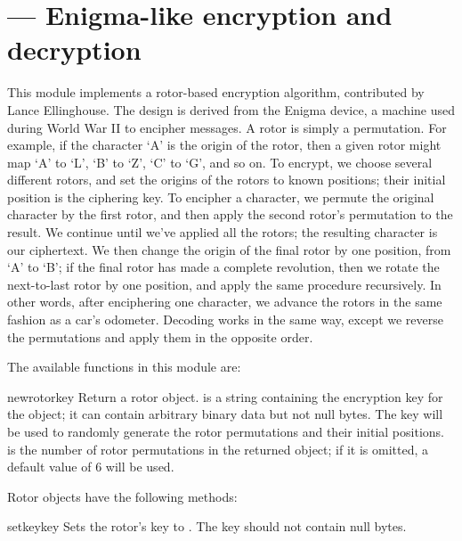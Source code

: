 \section{ ---
         Enigma-like encryption and decryption}




This module implements a rotor-based encryption algorithm, contributed by
Lance Ellinghouse.  The design is derived
from the Enigma device, a machine
used during World War II to encipher messages.  A rotor is simply a
permutation.  For example, if the character `A' is the origin of the rotor,
then a given rotor might map `A' to `L', `B' to `Z', `C' to `G', and so on.
To encrypt, we choose several different rotors, and set the origins of the
rotors to known positions; their initial position is the ciphering key.  To
encipher a character, we permute the original character by the first rotor,
and then apply the second rotor's permutation to the result. We continue
until we've applied all the rotors; the resulting character is our
ciphertext.  We then change the origin of the final rotor by one position,
from `A' to `B'; if the final rotor has made a complete revolution, then we
rotate the next-to-last rotor by one position, and apply the same procedure
recursively.  In other words, after enciphering one character, we advance
the rotors in the same fashion as a car's odometer. Decoding works in the
same way, except we reverse the permutations and apply them in the opposite
order.

The available functions in this module are:

\begin{funcdesc}{newrotor}{key}
Return a rotor object.  is a string containing the encryption key
for the object; it can contain arbitrary binary data but not null bytes.
The key will be used
to randomly generate the rotor permutations and their initial positions.
 is the number of rotor permutations in the returned object;
if it is omitted, a default value of 6 will be used.
\end{funcdesc}

Rotor objects have the following methods:

\begin{methoddesc}[rotor]{setkey}{key}
Sets the rotor's key to . The key should not contain null bytes.
\end{methoddesc}

